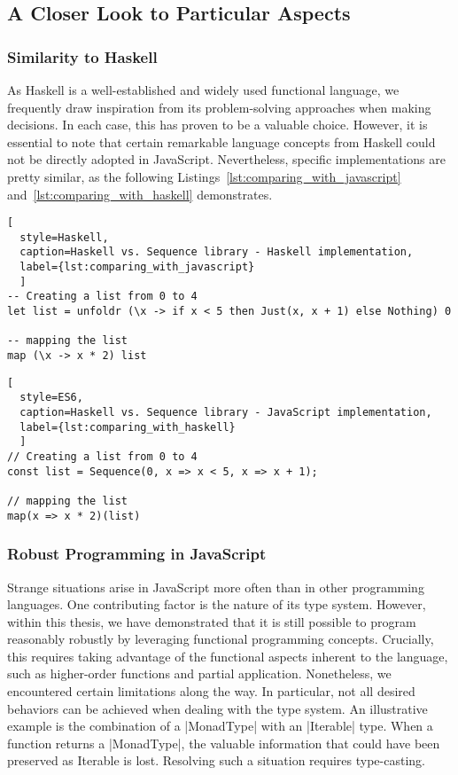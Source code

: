 \subsection{A Closer Look to Particular Aspects}
\label{A Closer Look to Particular Aspects}

\subsubsection{Similarity to Haskell}
\label{subsub:Similarity to Haskell}
As Haskell is a well-established and widely used functional language, we
frequently draw inspiration from its problem-solving approaches when making
decisions. In each case, this has proven to be a valuable choice. However, it
is essential to note that certain remarkable language concepts from Haskell
could not be directly adopted in JavaScript. Nevertheless, specific
implementations are pretty similar, as the following Listings~\ref{lst:comparing_with_javascript} 
and~\ref{lst:comparing_with_haskell} demonstrates.

\begin{lstlisting}[
  style=Haskell, 
  caption=Haskell vs. Sequence library - Haskell implementation, 
  label={lst:comparing_with_javascript}
  ]
-- Creating a list from 0 to 4
let list = unfoldr (\x -> if x < 5 then Just(x, x + 1) else Nothing) 0

-- mapping the list
map (\x -> x * 2) list 
\end{lstlisting}

\begin{lstlisting}[
  style=ES6, 
  caption=Haskell vs. Sequence library - JavaScript implementation,
  label={lst:comparing_with_haskell}
  ]
// Creating a list from 0 to 4
const list = Sequence(0, x => x < 5, x => x + 1);

// mapping the list
map(x => x * 2)(list)
\end{lstlisting}


\subsubsection{Robust Programming in JavaScript}
\label{subsub:Robust Programming in JavaScript}
Strange situations arise in JavaScript more often than in other programming
languages. One contributing factor is the nature of its type system. However,
within this thesis, we have demonstrated that it is still possible to program
reasonably robustly by leveraging functional programming concepts. Crucially,
this requires taking advantage of the functional aspects inherent to the
language, such as higher-order functions and partial application. Nonetheless,
we encountered certain limitations along the way. In particular, not all
desired behaviors can be achieved when dealing with the type system.
An illustrative example is the combination of a |MonadType| with an |Iterable|
type. When a function returns a  |MonadType|, the valuable information that could
have been preserved as Iterable is lost. Resolving such a situation requires
type-casting.

